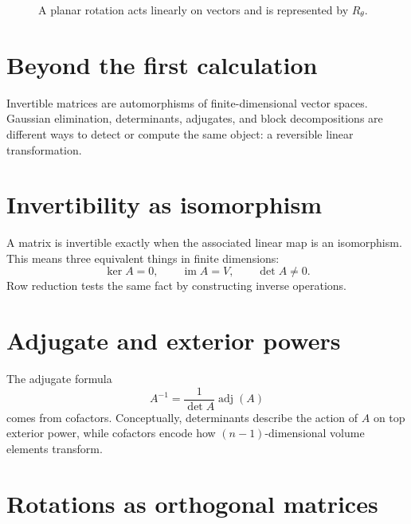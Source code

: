 \begin{figure}[H]
\centering
{}
\caption{A planar rotation acts linearly on vectors and is represented by \(R_\theta\).}
\end{figure}

\section{Beyond the first calculation}

Invertible matrices are automorphisms of finite-dimensional vector spaces.  Gaussian elimination, determinants, adjugates, and block decompositions are different ways to detect or compute the same object: a reversible linear transformation.

\section{Invertibility as isomorphism}

A matrix is invertible exactly when the associated linear map is an isomorphism.  This means three equivalent things in finite dimensions:
\[
  \ker A=0,\qquad \operatorname{im}A=V,\qquad \det A\ne0.
\]
Row reduction tests the same fact by constructing inverse operations.

\section{Adjugate and exterior powers}

The adjugate formula
\[
  A^{-1}=\frac{1}{\det A}\operatorname{adj}(A)
\]
comes from cofactors.  Conceptually, determinants describe the action of \(A\) on top exterior power, while cofactors encode how \((n-1)\)-dimensional volume elements transform.

\section{Rotations as orthogonal matrices}

